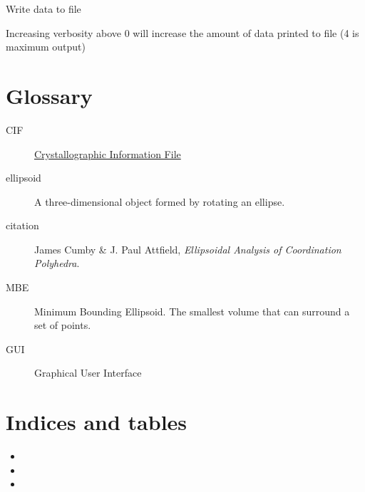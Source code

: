 \documentclass[a4paper,10pt,openany, oneside]{sphinxmanual}
\begin{document}
\begin{fulllineitems}
\label{api_reference:distellipsoid.writeproperties.writeall}
Write data to file

Increasing verbosity above 0 will increase the amount of data printed to file
(4 is maximum output)

\end{fulllineitems}



\chapter{Glossary}
\label{glossary:glossary}\label{glossary:citation}\label{glossary::doc}\begin{description}
\item[{CIF}] \leavevmode{}\label{glossary:term-cif}
\href{http://www.iucr.org/resources/cif}{Crystallographic Information File}

\item[{ellipsoid}] \leavevmode{}\label{glossary:term-ellipsoid}
A three-dimensional object formed by rotating an ellipse.

\item[{citation}] \leavevmode{}\label{glossary:term-citation}
James Cumby \& J. Paul Attfield, \emph{Ellipsoidal Analysis of Coordination Polyhedra}.

\item[{MBE}] \leavevmode{}\label{glossary:term-mbe}
Minimum Bounding Ellipsoid. The smallest volume {\hyperref[glossary:term\string-ellipsoid]{}} that can surround a set of points.

\item[{GUI}] \leavevmode{}\label{glossary:term-gui}
Graphical User Interface

\end{description}


\chapter{Indices and tables}
\label{index:indices-and-tables}\label{index:citation}\begin{itemize}
\item {} 

\item {} 

\item {} 

\end{itemize}
\end{document}
